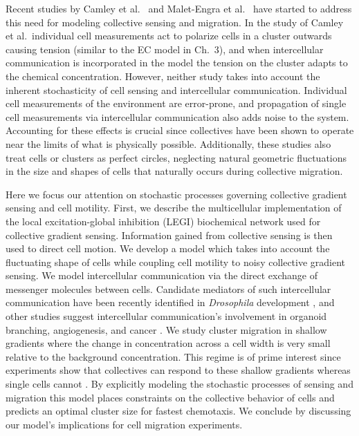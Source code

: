 Recent studies by Camley et al.\ \cite{camley2016emergent} and Malet-Engra et al.\ \cite{malet2015collective} have started to address this need for modeling collective sensing and migration.
In the study of Camley et al.\ individual cell measurements act to polarize cells in a cluster outwards causing tension (similar to the EC model in Ch.\ 3), and when intercellular communication is incorporated in the model the tension on the cluster adapts to the chemical concentration. However, neither study takes into account the inherent stochasticity of cell sensing and intercellular communication. Individual cell measurements of the environment are error-prone, and propagation of single cell measurements via intercellular communication also adds noise to the system. Accounting for these effects is crucial since collectives have been shown to operate near the limits of what is physically possible. Additionally, these studies also treat cells or clusters as perfect circles, neglecting natural geometric fluctuations in the size and shapes of cells that naturally occurs during collective migration.

Here we focus our attention on stochastic processes governing collective gradient sensing and cell motility. First, we describe the multicellular implementation of the local excitation-global inhibition (LEGI) biochemical network \cite{levchenko2002models} used for collective gradient sensing. Information gained from collective sensing is then used to direct cell motion. We develop a model which takes into account the fluctuating shape of cells while coupling cell motility to noisy collective gradient sensing. We model intercellular communication via the direct exchange of messenger molecules between cells. Candidate mediators of such intercellular communication have been recently identified in \textit{Drosophila} development \cite{ramel2013rab11}, and other studies suggest intercellular communication's involvement in organoid branching, angiogenesis, and cancer \cite{ellison2016cell,gerhardt2003vegf,hsu2000cadherin,friedl2009collective}. We study cluster migration in shallow gradients where the change in concentration across a cell width is very small relative to the background concentration. This regime is of prime interest since experiments show that collectives can respond to these shallow gradients whereas single cells cannot \cite{ellison2016cell,malet2015collective,rosoff2004new}. By explicitly modeling the stochastic processes of sensing and migration this model places constraints on the collective behavior of cells and predicts an optimal cluster size for fastest chemotaxis. We conclude by discussing our model's implications for cell migration experiments.


